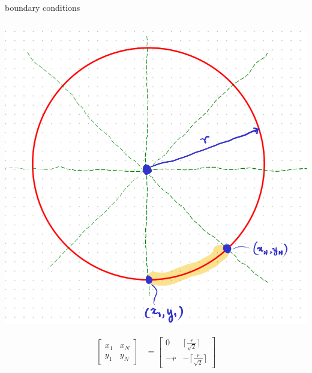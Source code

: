 \documentclass[aspectratio=169,xcolor={dvipsnames,svgnames}]{beamer}
\begin{document}
\begin{frame}[label={sec:orge547dc5}]{boundary conditions}
\begin{columns}
\begin{column}{.3\columnwidth}
\begin{center}
\includegraphics[width=.9\linewidth]{org-download-images/mid-point_algorithm/2024-09-03_21-50-20_screenshot.png}
\end{center}

\begin{align*}
  \begin{bmatrix} x_1 & x_N \\ y_1 & y_N \end{bmatrix}
  &= \begin{bmatrix}
    0 & \lceil\frac{r}{\sqrt{2}}\rceil \\
    -r & -\lceil\frac{r}{\sqrt{2}}\rceil \end{bmatrix}
\end{align*}
\end{column}


\end{columns}
\end{frame}
\end{document}
